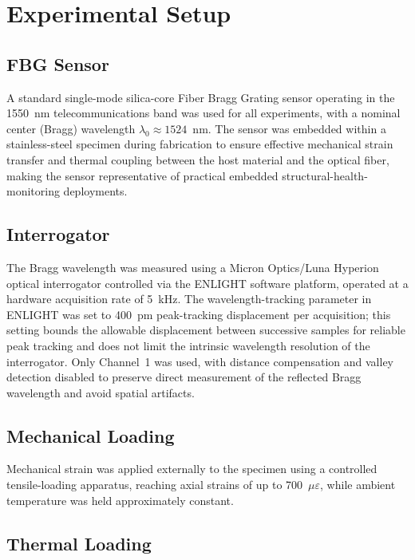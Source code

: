 \documentclass[journal,twoside,web]{ieeecolor}
\begin{document}
\section{Experimental Setup}
\label{sec:experimental}

\subsection{FBG Sensor}

A standard single-mode silica-core Fiber Bragg Grating sensor operating in
the 1550~nm telecommunications band was used for all experiments, with a
nominal center (Bragg) wavelength $\lambda_0 \approx 1524$~nm. The sensor
was embedded within a stainless-steel specimen during fabrication to ensure
effective mechanical strain transfer and thermal coupling between the host
material and the optical fiber, making the sensor representative of
practical embedded structural-health-monitoring deployments.

\subsection{Interrogator}

The Bragg wavelength was measured using a Micron Optics/Luna Hyperion
optical interrogator controlled via the ENLIGHT software platform, operated
at a hardware acquisition rate of 5~kHz. The wavelength-tracking parameter
in ENLIGHT was set to 400~pm peak-tracking displacement per acquisition;
this setting bounds the allowable displacement between successive samples
for reliable peak tracking and does not limit the intrinsic wavelength
resolution of the interrogator. Only Channel~1 was used, with distance
compensation and valley detection disabled to preserve direct measurement of
the reflected Bragg wavelength and avoid spatial artifacts.

\subsection{Mechanical Loading}

Mechanical strain was applied externally to the specimen using a controlled
tensile-loading apparatus, reaching axial strains of up to
700~$\mu\varepsilon$, while ambient temperature was held approximately
constant.

\subsection{Thermal Loading}
\end{document}
